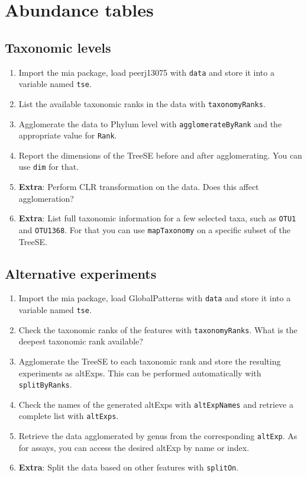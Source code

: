 \documentclass[
]{book}
\providecommand{\tightlist}{%
  \setlength{\itemsep}{0pt}\setlength{\parskip}{0pt}}
\begin{document}
\hypertarget{abundance-tables}{%
\section{Abundance tables}\label{abundance-tables}}

\hypertarget{taxonomic-levels}{%
\subsection{Taxonomic levels}\label{taxonomic-levels}}

\begin{enumerate}
\def\labelenumi{\arabic{enumi}.}
\tightlist
\item
  Import the mia package, load peerj13075 with \texttt{data} and store it into a
  variable named \texttt{tse}.
\item
  List the available taxonomic ranks in the data with \texttt{taxonomyRanks}.
\item
  Agglomerate the data to Phylum level with \texttt{agglomerateByRank} and the
  appropriate value for \texttt{Rank}.
\item
  Report the dimensions of the TreeSE before and after agglomerating. You can
  use \texttt{dim} for that.
\item
  \textbf{Extra}: Perform CLR transformation on the data. Does this affect agglomeration?
\item
  \textbf{Extra}: List full taxonomic information for a few selected taxa, such as
  \texttt{OTU1} and \texttt{OTU1368}. For that you can use \texttt{mapTaxonomy} on a specific subset
  of the TreeSE.
\end{enumerate}

\hypertarget{alternative-experiments}{%
\subsection{Alternative experiments}\label{alternative-experiments}}

\begin{enumerate}
\def\labelenumi{\arabic{enumi}.}
\tightlist
\item
  Import the mia package, load GlobalPatterns with \texttt{data} and store it into a
  variable named \texttt{tse}.
\item
  Check the taxonomic ranks of the features with \texttt{taxonomyRanks}. What is the
  deepest taxonomic rank available?
\item
  Agglomerate the TreeSE to each taxonomic rank and store the resulting
  experiments as altExps. This can be performed automatically with \texttt{splitByRanks}.
\item
  Check the names of the generated altExps with \texttt{altExpNames} and retrieve a
  complete list with \texttt{altExps}.
\item
  Retrieve the data agglomerated by genus from the corresponding \texttt{altExp}.
  As for assays, you can access the desired altExp by name or index.
\item
  \textbf{Extra}: Split the data based on other features with \texttt{splitOn}.
\end{enumerate}
\end{document}
